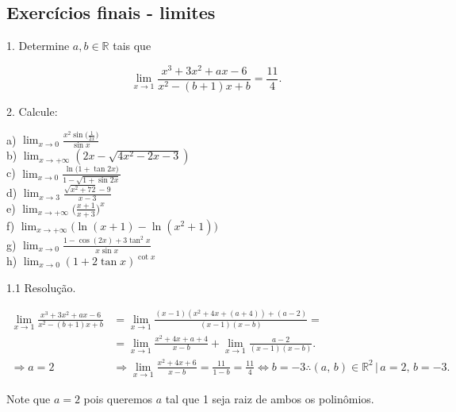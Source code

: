 \documentclass{article}
\begin{document}
{\begin{newpage}
\subsection{Exercícios finais - limites}
\par
\begin{flushleft}
1. Determine $a, b\in\mathbb{R}$ tais que
\end{flushleft}
$$\displaystyle{\lim_{x\to 1}} \frac{x^3 + 3x^2 + ax - 6}{x^2 - (b+1)x + b} = \frac{11}{4}.$$
\par
\vspace{0.3cm}
\begin{flushleft}
2. Calcule:
\end{flushleft}
\par
\begin{multicols}{2}
\hspace{-15pt}a) $\displaystyle{\lim_{x\to 0}} \frac{x^{2}\sin{\Big(\frac{1}{2x}\Big)}}{\sin{x}}$\\
b) $\displaystyle{\lim_{x\to +\infty }} (2x - \sqrt{4x^2 - 2x - 3})$\\
c) $\displaystyle{\lim_{x\to 0}} \frac{\ln{(1+\tan{2x}})}{1 - \sqrt{1 + \sin{2x}}}$\\
d) $\displaystyle{\lim_{x\to 3}} \frac{\sqrt{x^2 + 72} - 9}{x-3}$\\
e) $\displaystyle{\lim_{x\to +\infty }} \Big(\frac{x+1}{x+3}\Big)^x$ \\
f) $\displaystyle{\lim_{x\to +\infty }} \Big(\ln{(x+1)} - \ln{(x^2 + 1)}\Big)$ \\
g) $\displaystyle{\lim_{x\to 0}} \frac{1 - \cos{(2x)} + 3\tan^{2}{x}}{x\sin{x}}$\\
h) $\displaystyle{\lim_{x\to 0}} (1 + 2\tan{x})^{\cot{x}}$\\
\end{multicols}
\par
\vspace{0.3cm}
\begin{flushleft}
1.1 Resolução.
\end{flushleft}
\par
\begin{equation*}
\begin{split}
\lim_{x\to 1} \frac{x^3 + 3x^2 + ax - 6}{x^2 -(b+1)x +b}&=
\lim_{x\to 1}\frac{(x-1)(x^2+4x+(a+4))+(a-2)}{(x-1)(x-b)}=\\
&=\lim_{x\to1}\frac{x^2+4x+a+4}{x-b}+\lim_{x\to1}\frac{a-2}{(x-1)(x-b)}.\\
\Rightarrow a=2&\Rightarrow \lim_{x\to 1}\frac{x^2+4x+6}{x-b}
=\frac{11}{1-b}=\frac{11}{4}\Leftrightarrow b=-3
\therefore (a,\, b)\in{\mathbb{R}}^2\, |\, a=2,\, b=-3.
\end{split}
\end{equation*}
\par Note que $a=2$ pois queremos $a$ tal que 1 seja raiz de ambos os polinômios.
\vspace{0.3cm}


\end{newpage}}
\end{document}
